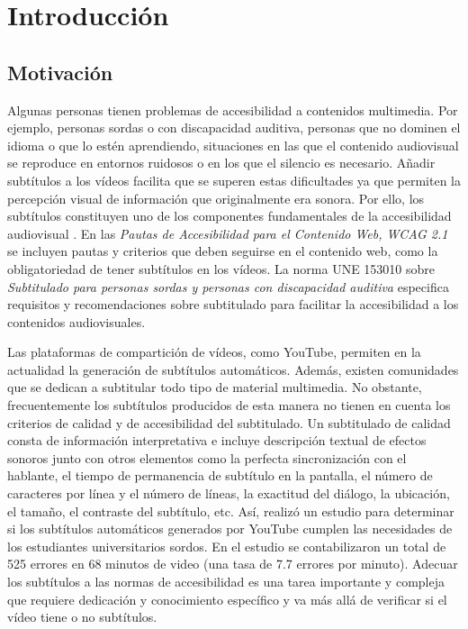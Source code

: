\documentclass[
  12pt,
  a4paper,
  extrafontsizes,
  onecolumn,
  openright,
  table]{memoir}
\newlength{\rf}
\begin{document}
\hypertarget{sec-intro}{%
\chapter{Introducción}\label{sec-intro}}

\hypertarget{motivaciuxf3n}{%
\section{Motivación}\label{motivaciuxf3n}}

Algunas personas tienen problemas de \gls{accesibilidad} a contenidos
multimedia. Por ejemplo, personas sordas o con discapacidad auditiva,
personas que no dominen el idioma o que lo estén aprendiendo,
situaciones en las que el contenido audiovisual se reproduce en entornos
ruidosos o en los que el silencio es necesario. Añadir subtítulos a los
vídeos facilita que se superen estas dificultades ya que permiten la
percepción visual de información que originalmente era sonora. Por ello,
los subtítulos constituyen uno de los componentes fundamentales de la
accesibilidad audiovisual \autocite[ver][]{jperez1}. En las \emph{Pautas
de Accesibilidad para el Contenido Web, WCAG 2.1}
\autocite[ver][]{WCAG21} se incluyen pautas y criterios que deben
seguirse en el contenido web, como la obligatoriedad de tener subtítulos
en los vídeos. La norma UNE 153010 \autocite[ver][]{aenor2012} sobre
\emph{Subtitulado para personas sordas y personas con discapacidad
auditiva} especifica requisitos y recomendaciones sobre subtitulado para
facilitar la accesibilidad a los contenidos audiovisuales.

Las plataformas de compartición de vídeos, como YouTube, permiten en la
actualidad la generación de subtítulos automáticos. Además, existen
comunidades que se dedican a subtitular todo tipo de material
multimedia. No obstante, frecuentemente los subtítulos producidos de
esta manera no tienen en cuenta los criterios de calidad y de
accesibilidad del subtitulado. Un subtitulado de calidad consta de
información interpretativa e incluye descripción textual de efectos
sonoros junto con otros elementos como la perfecta sincronización con el
hablante, el tiempo de permanencia de subtítulo en la pantalla, el
número de caracteres por línea y el número de líneas, la exactitud del
diálogo, la ubicación, el tamaño, el contraste del subtítulo, etc. Así,
\textcite{parton2016} realizó un estudio para determinar si los
subtítulos automáticos generados por YouTube cumplen las necesidades de
los estudiantes universitarios sordos. En el estudio se contabilizaron
un total de 525 errores en 68 minutos de video (una tasa de 7.7 errores
por minuto). Adecuar los subtítulos a las normas de accesibilidad es una
tarea importante y compleja que requiere dedicación y conocimiento
específico y va más allá de verificar si el vídeo tiene o no subtítulos.
\end{document}
